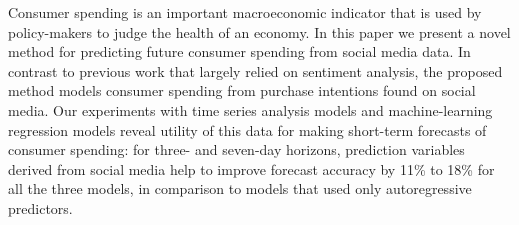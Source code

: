 Consumer spending is an important macroeconomic indicator that is used by policy-makers to judge the health of an economy. In this paper we present a novel method for predicting future consumer spending from social media data. In contrast to previous work that largely relied on sentiment analysis, the proposed method models consumer spending from purchase intentions found on social media. Our experiments with time series analysis models and machine-learning regression models reveal utility of this data for making short-term forecasts of consumer spending: for three- and seven-day horizons, prediction variables derived from social media help to improve forecast accuracy by 11\% to 18\% for all the three models, in comparison to models that used only autoregressive predictors.
